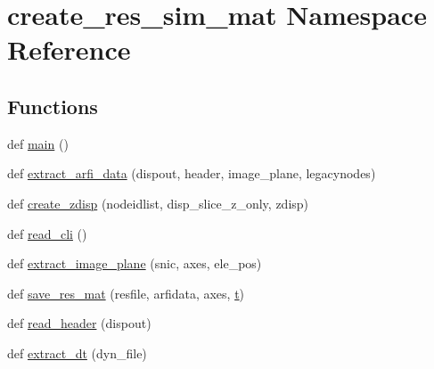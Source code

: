 \hypertarget{namespacecreate__res__sim__mat}{}\section{create\+\_\+res\+\_\+sim\+\_\+mat Namespace Reference}
\label{namespacecreate__res__sim__mat}
\subsection*{Functions}
\begin{DoxyCompactItemize}
\item 
def \hyperlink{namespacecreate__res__sim__mat_a606ad8a6d39174adbd2f7253ff733e2a}{main} ()
\item 
def \hyperlink{namespacecreate__res__sim__mat_af9dabec2b0d66834aaeae1dd2f6ae588}{extract\+\_\+arfi\+\_\+data} (dispout, header, image\+\_\+plane, legacynodes)
\item 
def \hyperlink{namespacecreate__res__sim__mat_a1731cdac3ad0afae24ea3d88ac5a3471}{create\+\_\+zdisp} (nodeidlist, disp\+\_\+slice\+\_\+z\+\_\+only, zdisp)
\item 
def \hyperlink{namespacecreate__res__sim__mat_a8237a5569e44ddf490f7d2173a4c56b3}{read\+\_\+cli} ()
\item 
def \hyperlink{namespacecreate__res__sim__mat_a36991d38a13e1cd603d67d13c549fa04}{extract\+\_\+image\+\_\+plane} (snic, axes, ele\+\_\+pos)
\item 
def \hyperlink{namespacecreate__res__sim__mat_a36ca0c809441bb01f607af61cc483e2e}{save\+\_\+res\+\_\+mat} (resfile, arfidata, axes, \hyperlink{defineImpResp_8m_aaccc9105df5383111407fd5b41255e23}{t})
\item 
def \hyperlink{namespacecreate__res__sim__mat_ace51ce9387ce5b304b797688375f06af}{read\+\_\+header} (dispout)
\item 
def \hyperlink{namespacecreate__res__sim__mat_aeae3e50426069c6b90f8f4314bdde1a9}{extract\+\_\+dt} (dyn\+\_\+file)
\end{DoxyCompactItemize}


